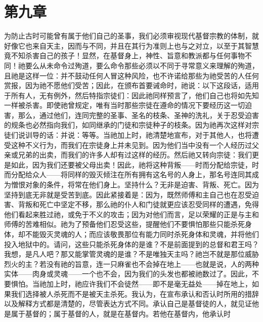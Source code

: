 
\section{第九章}

为防止古时可能曾有属于他们自己的圣事，我们必须审视现代基督宗教的体制，就好像它也来自天主，因而与不同，并且在其行为准则上也与之对立，以至于其智慧竟不知杀害自己的孩子！显然，在基督身上，神性、旨意和教派都与任何事物不同！祂要么从未命令过殉道，要么命令那些必须以不同于寻常意义来理解的殉道，且祂是这样一位：并不鼓动任何人冒这种风险，也不许诺给那些为祂受苦的人任何赏报，因为祂不愿他们受苦；因此，在颁布首要诫命时，祂说：以下这段话，适用于所有人，无有例外，然后特指宗徒们：因此祂同样预言了，他们自己也将如先知一样被杀害。即使祂曾规定，唯有当时那些宗徒在遵命的情况下要经历这一切迫害，那么，通过他们，连同完整的圣事、圣名的枝条、圣神的洗礼，关于忍受迫害的规条也必然指向我们，如同继承的门徒和宗徒种子的枝条。因为祂再次这样对宗徒们说训导的话：并说：等等。当祂加上时，祂清楚地宣布，对于其他人，也将遭受这种不义行为，而我们在宗徒身上并未见到。因为他们当中没有一个人经历过父亲或兄弟的出卖，而我们的许多人却有过这样的经历。然后祂又转向宗徒：我们更是如此，因为我们还要被父母出卖！因此，祂将这种背叛——时而分配给宗徒，时而分配给众人——将同样的毁灭倾注在所有拥有这名号的人身上，那名号连同其成为憎恨对象的条件，将常在他们身上。坚持什么？无非是迫害、背叛、死亡。因为坚持到底无非就是受苦到底。因此紧接着是：因为，既然师傅和主自己也在忍受迫害、背叛和死亡中坚定不移，那么祂的仆人和门徒就更应该忍受同样的遭遇，免得他们看起来胜过祂，或免于不义的攻击；因为对他们而言，足以荣耀的正是与主和师傅的苦难相似。祂为了预备他们忍受这些，提醒他们不要惧怕那些只能杀死身体，却不能毁灭灵魂的人；而应该敬畏那位有能力同时杀死身体和灵魂，并将他们投入地狱中的。请问，这些只能杀死身体的是谁？不是前面提到的总督和君王吗？我想，是凡人吧？那又能掌管灵魂的是谁？不是唯独天主吗？祂岂不就是那位威胁烈火的主？若没有祂的旨意，连一只麻雀也不会掉在地上——也就是说，人的两种实体——肉身或灵魂——一个也不会，因为我们的头发也都被祂数过了。因此，不要惧怕。当祂加上时，祂应许我们不会徒然——即不是毫无益处——掉在地上，如果我们选择被人杀死而不是被天主杀死。我认为，在宣布承认和否认时所用的措辞以及解释方式都是清楚的，尽管表达方式不同。承认自己是基督徒的人，就见证他是属于基督的；属于基督的人，就是在基督内。若他在基督内，他承认时